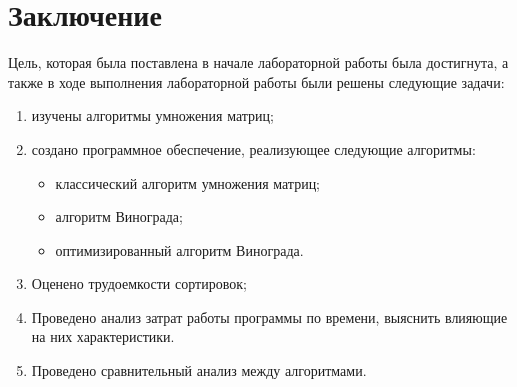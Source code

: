 \chapter*{Заключение}

Цель, которая была поставлена в начале лабораторной работы была достигнута, а также в ходе выполнения лабораторной работы были решены следующие задачи:
\begin{enumerate}[label={\arabic*)}]
	\item изучены алгоритмы умножения матриц;
	\item создано программное обеспечение, реализующее следующие алгоритмы:
	\begin{itemize}
		\item классический алгоритм умножения матриц;
		\item алгоритм Винограда;
		\item оптимизированный алгоритм Винограда.
	\end{itemize}
	\item Оценено трудоемкости сортировок;
	\item Проведено анализ затрат работы программы по времени, выяснить влияющие на них характеристики.
	\item Проведено сравнительный анализ между алгоритмами.
\end{enumerate}
